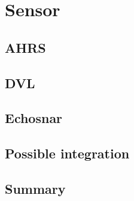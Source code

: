 \chapter{Sensor}
\label{chap:third}
\ifpdf
    \graphicspath{{Chapter3/Figures/PNG/}{Chapter3/Figures/PDF/}{Chapter3/Figures/}{Chapter3/Figures/EPS/}}
\else
    \graphicspath{{Chapter3/Figures/EPS/}{Chapter3/Figures/}}
\fi

\section{AHRS}
\section{DVL}
\section{Echosnar}
\section{Possible integration}
\section{Summary}